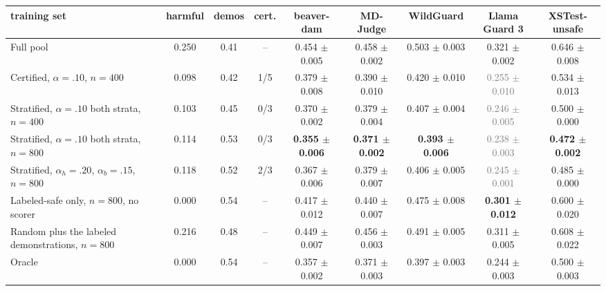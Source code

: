 \begin{tabular}{lcccccccc}
\toprule
training set & harmful & demos & cert. & beaver-dam & MD-Judge & WildGuard & Llama Guard 3 & XSTest-unsafe \\
\midrule
Full pool & 0.250 & 0.41 & -- & 0.454 $\pm$ 0.005 & 0.458 $\pm$ 0.002 & 0.503 $\pm$ 0.003 & 0.321 $\pm$ 0.002 & 0.646 $\pm$ 0.008 \\
Certified, $\alpha{=}.10$, $n{=}400$ & 0.098 & 0.42 & 1/5 & 0.379 $\pm$ 0.008 & 0.390 $\pm$ 0.010 & 0.420 $\pm$ 0.010 & \textcolor{gray}{0.255 $\pm$ 0.010} & 0.534 $\pm$ 0.013 \\
Stratified, $\alpha{=}.10$ both strata, $n{=}400$ & 0.103 & 0.45 & 0/3 & 0.370 $\pm$ 0.002 & 0.379 $\pm$ 0.004 & 0.407 $\pm$ 0.004 & \textcolor{gray}{0.246 $\pm$ 0.005} & 0.500 $\pm$ 0.000 \\
Stratified, $\alpha{=}.10$ both strata, $n{=}800$ & 0.114 & 0.53 & 0/3 & \textbf{0.355 $\pm$ 0.006} & \textbf{0.371 $\pm$ 0.002} & \textbf{0.393 $\pm$ 0.006} & \textcolor{gray}{0.238 $\pm$ 0.003} & \textbf{0.472 $\pm$ 0.002} \\
Stratified, $\alpha_h{=}.20$, $\alpha_b{=}.15$, $n{=}800$ & 0.118 & 0.52 & 2/3 & 0.367 $\pm$ 0.006 & 0.379 $\pm$ 0.007 & 0.406 $\pm$ 0.005 & \textcolor{gray}{0.245 $\pm$ 0.001} & 0.485 $\pm$ 0.000 \\
Labeled-safe only, $n{=}800$, no scorer & 0.000 & 0.54 & -- & 0.417 $\pm$ 0.012 & 0.440 $\pm$ 0.007 & 0.475 $\pm$ 0.008 & \textbf{0.301 $\pm$ 0.012} & 0.600 $\pm$ 0.020 \\
Random plus the labeled demonstrations, $n{=}800$ & 0.216 & 0.48 & -- & 0.449 $\pm$ 0.007 & 0.456 $\pm$ 0.003 & 0.491 $\pm$ 0.005 & 0.311 $\pm$ 0.005 & 0.608 $\pm$ 0.022 \\
Oracle & 0.000 & 0.54 & -- & 0.357 $\pm$ 0.002 & 0.371 $\pm$ 0.003 & 0.397 $\pm$ 0.003 & 0.244 $\pm$ 0.003 & 0.500 $\pm$ 0.003 \\
\bottomrule
\end{tabular}
